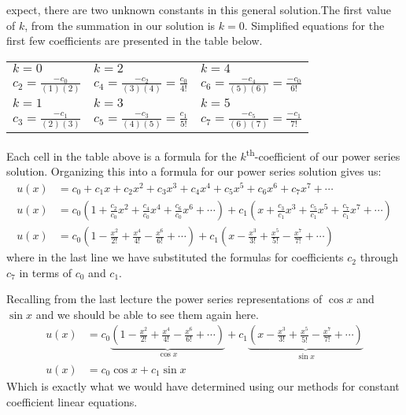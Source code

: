  expect, there are two unknown constants in this general solution.The first value of $k$, from the summation in our solution is $k=0$.  Simplified equations for the first few coefficients are presented in the table below.
\begin{table*}
\begin{tabular}{l | l | l}
$k=0$ & $k=2$ & $k=4$ \\
$c_2=\frac{-c_0}{(1)(2)}$ & $c_4=\frac{-c_2}{(3)(4)}=\frac{c_0}{4!}$ & $c_6 = \frac{-c_4}{(5)(6)} = \frac{-c_0}{6!}$ \\\hline
$k=1$ & $k=3$ & $k=5$ \\
$c_3 = \frac{-c_1}{(2)(3)}$ & $c_5 = \frac{-c_3}{(4)(5)}=\frac{c_1}{5!}$ & $c_7=\frac{-c_5}{(6)(7)} = \frac{-c_1}{7!}$\\
\end{tabular}
\end{table*}
Each cell in the table above is a formula for the $k$\textsuperscript{th}-coefficient of our power series solution.  Organizing this into a formula for our power series solution gives us:
\begin{align*}
u(x) &= c_0 + c_1x + c_2x^2+c_3x^3+c_4x^4+c_5x^5+c_6x^6+c_7x^7 + \cdots \\
u(x) &= c_0\left(1 + \frac{c_2}{c_0}x^2 + \frac{c_4}{c_0}x^4 + \frac{c_6}{c_0}x^6 + \cdots \right) + c_1\left(x + \frac{c_3}{c_1}x^3 + \frac{c_5}{c_1}x^5 + \frac{c_7}{c_1}x^7 + \cdots \right) \\
u(x)&=c_0\left(1-\frac{x^2}{2!}+\frac{x^4}{4!}-\frac{x^6}{6!} + \cdots  \right) + c_1\left(x -\frac{x^3}{3!}+\frac{x^5}{5!} - \frac{x^7}{7!} + \cdots \right)
\end{align*}
where in the last line we have substituted the formulas for coefficients $c_2$ through $c_7$ in terms of $c_0$ and $c_1$.

Recalling from the last lecture the power series representations of $\cos{x}$ and $\sin{x}$ and we should be able to see them again here.
\begin{align*}
u(x)&=c_0\underbrace{\left(1-\frac{x^2}{2!}+\frac{x^4}{4!}-\frac{x^6}{6!} + \cdots  \right)}_{\cos{x}} + c_1\underbrace{\left(x -\frac{x^3}{3!}+\frac{x^5}{5!} - \frac{x^7}{7!} + \cdots \right)}_{\sin{x}} \\
u(x)&=c_0\cos{x} + c_1\sin{x}
\end{align*}
Which is exactly what we would have determined using our methods for constant coefficient linear equations.

